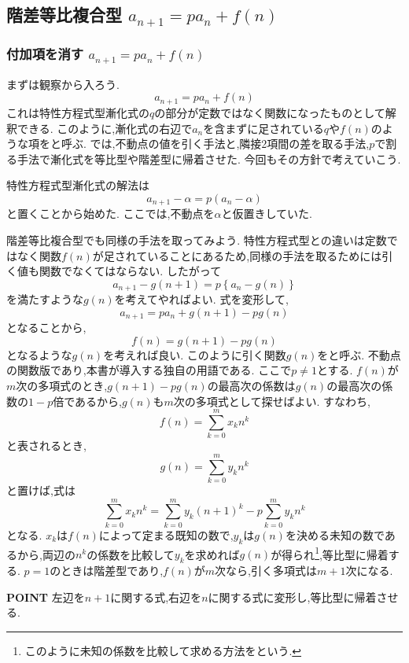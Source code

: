
\subsection{\texorpdfstring{階差等比複合型  $a_{n+1}=pa_n+f(n)$}{階差等比複合型}}\label{節：階差等比複合型}
\subsubsection{\texorpdfstring{付加項を消す  $a_{n+1}=pa_n+f(n)$}{付加項を消す}}
まずは観察から入ろう.
\[
  a_{n+1}=pa_n+f(n)
\]
これは特性方程式型漸化式の$q$の部分が定数ではなく関数になったものとして解釈できる.
このように,漸化式の右辺で$a_n$を含まずに足されている$q$や$f(n)$のような項を\textbf{}と呼ぶ.
では,不動点の値を引く手法と,隣接2項間の差を取る手法,$p$で割る手法で漸化式を等比型や階差型に帰着させた.
今回もその方針で考えていこう.


特性方程式型漸化式の解法は
\[
  a_{n+1}-\alpha=p(a_n-\alpha)
\]
と置くことから始めた.
ここでは,不動点を$\alpha$と仮置きしていた.

階差等比複合型でも同様の手法を取ってみよう.
特性方程式型との違いは定数ではなく関数$f(n)$が足されていることにあるため,同様の手法を取るためには引く値も関数でなくてはならない.
したがって
\[
  a_{n+1}-g(n+1)=p\left\{a_n-g(n)\right\}
\]
を満たすような$g(n)$を考えてやればよい.
式を変形して,
\[
  a_{n+1}=pa_n+g(n+1)-pg(n)
\]
となることから,
\[
  f(n)=g(n+1)-pg(n)
\]
となるような$g(n)$を考えれば良い.
このように引く関数$g(n)$を\textbf{}と呼ぶ.
不動点の関数版であり,本書が導入する独自の用語である.
ここで$p\ne1$とする.
$f(n)$が$m$次の多項式のとき,$g(n+1)-pg(n)$の最高次の係数は$g(n)$の最高次の係数の$1-p$倍であるから,$g(n)$も$m$次の多項式として探せばよい.
すなわち,
\[
  f(n)=\sum_{k=0}^{m} x_kn^k
\]
と表されるとき,
\[
  g(n)=\sum_{k=0}^{m} y_kn^k
\]
と置けば,式は
\[
  \sum_{k=0}^{m} x_kn^k=\sum_{k=0}^{m} y_k(n+1)^k-p\sum_{k=0}^{m} y_kn^k
\]
となる.
$x_k$は$f(n)$によって定まる既知の数で,$y_k$は$g(n)$を決める未知の数であるから,両辺の$n^k$の係数を比較して$y_k$を求めれば$g(n)$が得られ\footnote{このように未知の係数を比較して求める方法をという.},等比型に帰着する.
$p=1$のときは階差型であり,$f(n)$が$m$次なら,引く多項式は$m+1$次になる.

\begin{bookpoint}
  \textbf{POINT}
  左辺を$n+1$に関する式,右辺を$n$に関する式に変形し,等比型に帰着させる.
\end{bookpoint}

